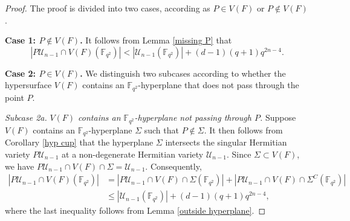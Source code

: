 \documentclass[10pt,a4paper]{amsart}
\newcommand{\Fqt}{\mathbb{F}_{q^2}}
\newcommand{\U}{\mathcal{U}}
\begin{document}
\begin{proof}
The proof is divided into two cases, according as $P\in V(F)$ or $P\notin V(F)$.

    \textbf{Case 1: $P\notin V(F)$.} It follows from Lemma \ref{missing P} that $$|P\U_{n-1}\cap V(F)(\Fqt)|< |\U_{n-1}(\Fqt)|+(d-1)(q+1)q^{2n-4}.$$

    \textbf{Case 2: $P\in V(F)$.} We distinguish two subcases according to whether the hypersurface $V(F)$ contains an $\Fqt$-hyperplane that does not pass through the point $P$.


    \textit{Subcase 2a.} \textit{$V(F)$ contains an $\Fqt$-hyperplane not passing through $P$.} Suppose $V(F)$ contains an $\Fqt$-hyperplane $\Sigma$ such that $P\notin \Sigma$. It then follows from Corollary \ref{hyp cup} that the hyperplane $\Sigma$ intersects the singular Hermitian variety $P\U_{n-1}$ at a non-degenerate Hermitian variety $\U_{n-1}$. Since $\Sigma\subset V(F)$, we have $P\U_{n-1}\cap V(F)\cap \Sigma =\U_{n-1}$. Consequently, 
    \begin{align*}
        |P\U_{n-1}\cap V(F)(\Fqt)| &= |P\U_{n-1}\cap V(F)\cap \Sigma(\Fqt)|+|P\U_{n-1}\cap V(F)\cap \Sigma^C(\Fqt)|\\
        & \leq |\U_{n-1}(\Fqt)|+(d-1)(q+1)q^{2n-4},
        \end{align*}
        where the last inequality follows from Lemma \ref{outside hyperplane}.


\end{proof}
\end{document}
